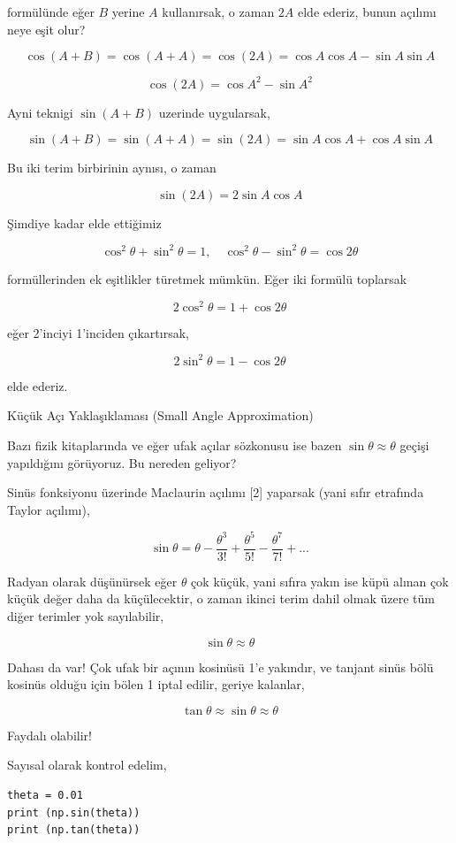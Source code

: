\documentclass[12pt,fleqn]{article}\usepackage{../../common}
\begin{document}
formülünde eğer $B$ yerine $A$ kullanırsak, o zaman $2A$ elde ederiz, bunun
açılımı neye eşit olur?

$$
\cos(A+B) = \cos(A+A) = \cos(2A) = \cos A \cos A - \sin A \sin A
$$

$$
\cos(2A) = \cos A^2 - \sin A^2
$$

Ayni teknigi $\sin(A+B)$ uzerinde uygularsak,

$$
\sin(A+B) = \sin(A+A) = \sin(2A) =
\sin A \cos A + \cos A \sin A
$$

Bu iki terim birbirinin aynısı, o zaman

$$
\sin(2A) = 2\sin A \cos A
$$

Şimdiye kadar elde ettiğimiz

$$
\cos^2\theta + \sin^2\theta = 1, \quad
\cos^2\theta - \sin^2\theta = \cos2\theta
$$

formüllerinden ek eşitlikler türetmek mümkün. Eğer iki formülü toplarsak

$$
2\cos^2\theta = 1 + \cos2\theta 
$$

eğer 2'inciyi 1'inciden çıkartırsak,

$$
2\sin^2\theta = 1 - \cos2\theta
$$

elde ederiz.

Küçük Açı Yaklaşıklaması (Small Angle Approximation)

Bazı fizik kitaplarında ve eğer ufak açılar sözkonusu ise bazen $\sin\theta
\approx \theta$ geçişi yapıldığını görüyoruz. Bu nereden geliyor?

Sinüs fonksiyonu üzerinde Maclaurin açılımı [2] yaparsak (yani sıfır etrafında
Taylor açılımı),

$$
\sin\theta =
\theta -
\frac{\theta^3}{3!} +
\frac{\theta^5}{5!} -
\frac{\theta^7}{7!} + ...
$$

Radyan olarak düşünürsek eğer $\theta$ çok küçük, yani sıfıra yakın ise küpü
alınan çok küçük değer daha da küçülecektir, o zaman ikinci terim dahil olmak
üzere tüm diğer terimler yok sayılabilir,

$$
\sin\theta \approx \theta
$$

Dahası da var! Çok ufak bir açının kosinüsü 1'e yakındır, ve tanjant sinüs bölü
kosinüs olduğu için bölen 1 iptal edilir, geriye kalanlar,

$$
\tan\theta \approx \sin\theta \approx \theta
$$

Faydalı olabilir!

Sayısal olarak kontrol edelim,

\begin{verbatim}
theta = 0.01
print (np.sin(theta))
print (np.tan(theta))
\end{verbatim}
\end{document}
